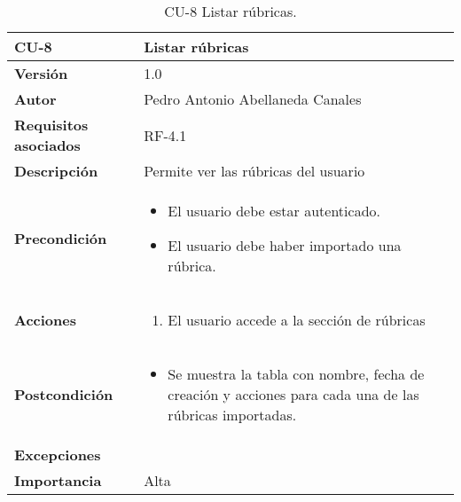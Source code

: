\begin{table}[p]
	\centering
	\begin{tabularx}{\linewidth}{ p{} p{} }
		\toprule
		\textbf{CU-8}    & \textbf{Listar rúbricas} \\
		\midrule
		\textbf{Versión}              & 1.0    \\
		\textbf{Autor}                & Pedro Antonio Abellaneda Canales \\
		\textbf{Requisitos asociados} & RF-4.1 \\
		\textbf{Descripción}          & Permite ver las rúbricas del usuario \\
		\textbf{Precondición}          & \begin{itemize}
                                        \tightlist
		                                  \item El usuario debe estar autenticado.
		                                  \item El usuario debe haber importado una rúbrica.
		                                 \end{itemize} \\
		\textbf{Acciones}             &
		\begin{enumerate}
			\def\labelenumi{\arabic{enumi}.}
			\tightlist
			\item El usuario accede a la sección de rúbricas
		\end{enumerate} \\
		\textbf{Postcondición}        & \begin{itemize}
                                        \tightlist
		                                  \item Se muestra la tabla con nombre, fecha de creación y acciones para cada una de las rúbricas importadas.		           
		                                 \end{itemize} \\ 
		\textbf{Excepciones}          & \\ 
		\textbf{Importancia}          & Alta \\
		\bottomrule
	\end{tabularx}
	\caption{CU-8 Listar rúbricas.}
	\label{tab:CU-8}
\end{table}

